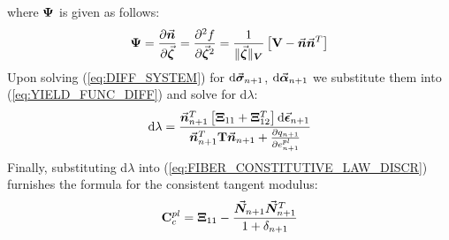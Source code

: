 \noindent where $\mathbf{\Psi}$ is given as follows:
\begin{equation}
	\mathbf{\Psi} = \frac{\partial\vec{\bm{n}}}{\partial \vec{\bm{\zeta}}}=
	\frac{\partial^2 f}{\partial \vec{\bm{\zeta}}^2} = \frac{1}{\Vert
		\vec{\bm{\zeta}}\Vert_{\bm{V}}}\left[ \mathbf{V}-\vec{\bm{n}}\vec{\bm{n}}^T\right]
	\label{eq:B}
\end{equation}
Upon solving (\ref{eq:DIFF_SYSTEM}) for $\text{d}\vec{\bm{\sigma}}_{n+1}$,
$\text{d}\vec{\bm{\alpha}}_{n+1}$ we substitute them into (\ref{eq:YIELD_FUNC_DIFF})
and solve for d$\lambda$:
\begin{equation}
	\text{d}\lambda =
	\frac{\vec{\bm{n}}_{n+1}^T\left[\mathbf{\Xi}_{11}+\mathbf{\Xi}_{12}^T\right]\text{d}\vec{\bm{\epsilon}}_{n+1}}{\vec{\bm{n}}_{n+1}^T\mathbf{T}\vec{\bm{n}}_{n+1}+
		\frac{\partial q_{n+1}}{\partial e_{n+1}^{pl}}}
	\label{eq:DE_GAMMA}
\end{equation}
Finally, substituting d$\lambda$ into (\ref{eq:FIBER_CONSTITUTIVE_LAW_DISCR}) 
furnishes the formula for the consistent tangent modulus:
\begin{equation}
	\mathbf{C}_c^{pl} = 
	\mathbf{\Xi}_{11}-\frac{\vec{\bm{N}}_{n+1}\vec{\bm{N}}_{n+1}^T}{1+\delta_{n+1}}
	\label{eq:CONSISTENT TANGENT MOD}
\end{equation}


